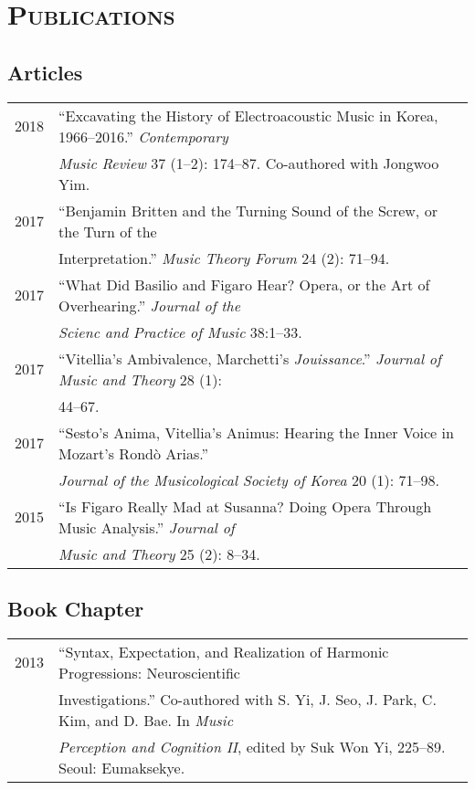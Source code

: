 \documentclass[a4paper,11pt]{article}
\begin{document}
  
  \section*{\textsc{Publications}}

  \subsection*{Articles}
  \hspace*{-0.25cm}
  \begin{tabular}{p{2.5cm} p{12.5cm}}
    2018 & ``Excavating the History of Electroacoustic Music in Korea, 1966--2016.'' \textit{Contemporary}\\
    & \textit{Music Review} 37 (1--2): 174--87. Co-authored with Jongwoo Yim.\\[2mm]
    
    2017 & ``Benjamin Britten and the Turning Sound of the Screw, or the Turn of the\\ 
    & Interpretation.'' \textit{Music Theory Forum} 24 (2): 71--94.\\[2mm]
    
    2017 & ``What Did Basilio and Figaro Hear? Opera, or the Art of Overhearing.'' \textit{Journal of the}\\ 
    & \textit{Scienc and Practice of Music} 38:1--33.\\[2mm]
    
    2017 & ``Vitellia's Ambivalence, Marchetti's \textit{Jouissance}.'' \textit{Journal of Music and Theory} 28 (1):\\
    & 44--67.\\[2mm]
    
    2017 & ``Sesto's Anima, Vitellia's Animus: Hearing the Inner Voice in Mozart's Rond\`{o} Arias.''\\
    & \textit{Journal of the Musicological Society of Korea} 20 (1): 71--98.\\[2mm]
    
    2015 & ``Is Figaro Really Mad at Susanna? Doing Opera Through Music Analysis.'' \textit{Journal of}\\
    & \textit{Music and Theory} 25 (2): 8--34.
  \end{tabular}
    
  \subsection*{Book Chapter}
  \hspace*{-0.25cm}
  \begin{tabular}{p{2.5cm} p{12.5cm}}
    2013 & “Syntax, Expectation, and Realization of Harmonic Progressions: Neuroscientific\\
    & Investigations.” Co-authored with S. Yi, J. Seo, J. Park, C. Kim, and D. Bae. In \textit{Music} \\
    & \textit{Perception and Cognition II}, edited by Suk Won Yi, 225–89. Seoul: Eumaksekye.
  \end{tabular}
    
\end{document}
